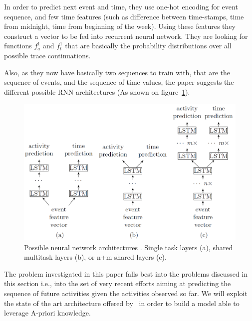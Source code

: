 In order to predict next event and time, they use one-hot encoding for event sequence, and few time features (such as difference between time-stamps, time from midnight, time from beginning of the week). Using these features they construct a vector to be fed into recurrent neural network. They are looking for functions $f_a^1$ and $f_t^1$ that are basically the probability distributions over all possible trace continuations.

Also, as they now have basically two sequences to train with, that are the sequence of events, and the sequence of time values, the paper suggests the different possible RNN architectures (As shown on figure~\ref{figure:architectureslstm}). 

\begin{figure}[!ht]
	\begin{center}  
		\includegraphics[width=\textwidth]{1.png}
		\caption{Possible neural network architectures \cite{niek96732}. Single task layers (a), shared multitask layers (b), or n+m shared layers (c).}
		\label{figure:architectureslstm}	
	\end{center}
\end{figure}



The problem investigated in this paper falls best into the problems discussed in this section i.e., into the set of very recent efforts aiming at predicting the sequence of future activities given the activities observed so far. We will exploit the state of the art architecture offered by~\cite{niek96732} in order to build a model able to leverage A-priori knowledge.

